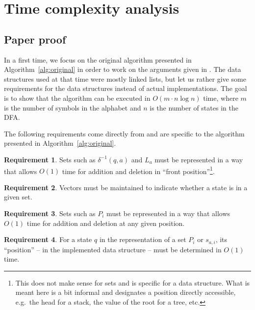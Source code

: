 \documentclass[12pt, a4 paper]{article}
\theoremstyle{definition}
\newtheorem{requirement}{Requirement}
\begin{document}
\section{Time complexity analysis}

\subsection{Paper proof}

In a first time, we focus on the original algorithm presented in Algorithm~\ref{alg:original} in order to work on the arguments given in \cite{Hop71}.
The data structures used at that time were mostly linked lists, but let us rather give some requirements for the data structures instead of actual implementations.
The goal is to show that the algorithm can be executed in $O(m \cdot n \log n)$ time, where $m$ is the number of symbols in the alphabet and $n$ is the number of states in the DFA.

The following requirements come directly from \cite{Hop71} and are specific to the algorithm presented in Algorithm~\ref{alg:original}.

\begin{requirement}
    \label{req:1}
Sets such as $\delta^{-1}(q, a)$ and $L_a$ must be represented in a way that allows $O(1)$ time for addition and deletion in ``front position''\footnote{This does not make sense for sets and is specific for a data structure. What is meant here is a bit informal and designates a position directly accessible, e.g.\ the head for a stack, the value of the root for a tree, etc.}.
\end{requirement}

\begin{requirement}
    \label{req:2}
Vectors must be maintained to indicate whether a state is in a given set.
\end{requirement}

\begin{requirement}
    \label{req:3}
Sets such as $P_i$ must be represented in a way that allows $O(1)$ time for addition and deletion at any given position.
\end{requirement}

\begin{requirement}
    \label{req:4}
For a state $q$ in the representation of a set $P_i$ or $s_{a,i}$, its ``position'' -- in the implemented data structure -- must be determined in $O(1)$ time.
\end{requirement}
\end{document}
